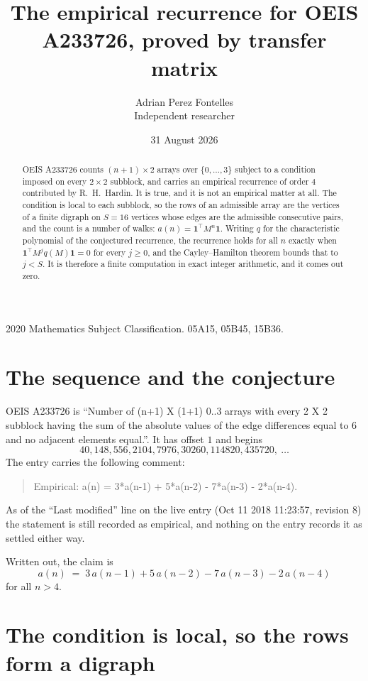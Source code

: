 \documentclass[11pt,a4paper]{article}
\title{The empirical recurrence for OEIS A233726, proved by transfer matrix}
\author{Adrian Perez Fontelles\\ \small Independent researcher}
\date{31 August 2026}
\theoremstyle{plain}
\theoremstyle{definition}
\begin{document}
\maketitle

\begin{abstract}
OEIS A233726 counts $(n+1)\times2$ arrays over $\{0,\dots,3\}$ subject to a condition imposed on
every $2\times2$ subblock, and carries an empirical recurrence of order $4$ contributed
by R.~H.~Hardin. It is true, and it is not an empirical matter at all. The condition is local
to each subblock, so the rows of an admissible array are the vertices of a finite digraph
on $S=16$ vertices whose edges are the admissible consecutive pairs, and the count is a
number of walks: $a(n)=\mathbf{1}^{\!\top}M^{n}\mathbf{1}$. Writing $q$
for the characteristic polynomial of the conjectured recurrence, the recurrence holds for all
$n$ exactly when $\mathbf{1}^{\!\top}M^{j}q(M)\mathbf{1}=0$ for every $j\ge0$, and the
Cayley--Hamilton theorem bounds that to $j<S$. It is therefore a finite computation in exact
integer arithmetic, and it comes out zero.
\end{abstract}

\noindent\small 2020 Mathematics Subject Classification. 05A15, 05B45, 15B36.\normalsize

\section{The sequence and the conjecture}

OEIS A233726 is ``Number of (n+1) X (1+1) 0..3 arrays with every 2 X 2 subblock having the sum of the absolute values of the edge differences equal to 6 and no adjacent elements equal.''. It has offset $1$ and begins
\[
40, 148, 556, 2104, 7976, 30260, 114820, 435720,\ \dots
\]
The entry carries the following comment:
\begin{quote}\small
Empirical: a(n) = 3*a(n-1) + 5*a(n-2) - 7*a(n-3) - 2*a(n-4).
\end{quote}
As of the ``Last modified'' line on the live entry (Oct 11 2018 11:23:57, revision 8) the statement is
still recorded as empirical, and nothing on the entry records it as settled either way.

Written out, the claim is
\begin{equation}\label{eq:conj}
a(n)\;=\;3\,a(n-1) + 5\,a(n-2) - 7\,a(n-3) - 2\,a(n-4)
\end{equation}
for all $n>4$.

\section{The condition is local, so the rows form a digraph}
\end{document}
